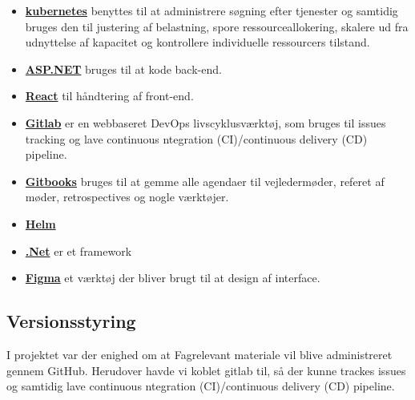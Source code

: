 \begin{itemize}
    \item \underline{\textbf{ kubernetes}} benyttes til at administrere søgning efter tjenester og samtidig bruges den til justering af belastning, spore ressourceallokering, skalere ud fra udnyttelse af kapacitet og kontrollere individuelle ressourcers tilstand.
    \item \underline{\textbf{ ASP.NET}} bruges til at kode back-end.
    \item \underline{\textbf{ React}} til håndtering af front-end.
    \item \underline{\textbf{ Gitlab}} er en webbaseret DevOps livscyklusværktøj, som bruges til issues tracking og lave continuous ntegration (CI)/continuous delivery (CD) pipeline. 
    \item \underline{\textbf{ Gitbooks}} bruges til at gemme alle agendaer til vejledermøder, referet af møder, retrospectives og nogle værktøjer.
    \item \underline{\textbf{ Helm}}
    \item \underline{\textbf{ .Net}} er et framework
    \item \underline{\textbf{ Figma}} et værktøj der bliver brugt til at design af interface.
   
  
\end{itemize}


\subsection{Versionsstyring}
I projektet var der enighed om at Fagrelevant materiale vil blive administreret gennem GitHub. Herudover havde vi koblet gitlab til, så der kunne trackes issues og samtidig lave continuous ntegration (CI)/continuous delivery (CD) pipeline.



